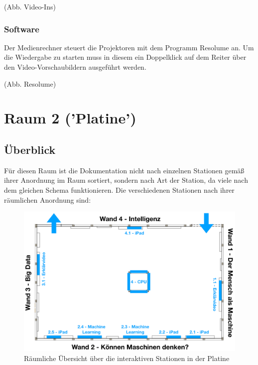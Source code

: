 \documentclass [titlepage,a4paper]{article}
\begin{document}
(Abb. Video-Ins)

\subsubsection{Software}

Der Medienrechner steuert die Projektoren mit dem Programm Resolume an. Um die Wiedergabe zu starten muss in diesem ein Doppelklick auf dem Reiter über den Video-Vorschaubildern ausgeführt werden.

(Abb. Resolume)






\newpage
\section{Raum 2 ('Platine')}

\subsection{Überblick}

Für diesen Raum ist die Dokumentation nicht nach einzelnen Stationen gemäß ihrer Anordnung im Raum sortiert, sondern nach Art der Station, da viele nach dem gleichen Schema funktionieren. Die verschiedenen Stationen nach ihrer räumlichen Anordnung sind: 

\begin{figure} [H]
    \centering
    \includegraphics [width=1\textwidth]{images/Stationen_Platine.pdf}
    \caption{Räumliche Übersicht über die interaktiven Stationen in der Platine}
    \label{stationen_platine}
\end{figure}
\end{document}

